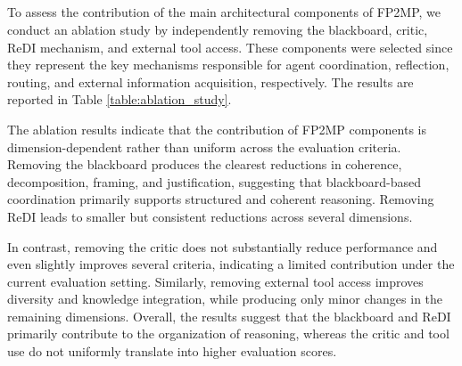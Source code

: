 \subsection{}

To assess the contribution of the main architectural components of FP2MP, we conduct an ablation study by independently removing the blackboard, critic, ReDI mechanism, and external tool access.
These components were selected since they represent the key mechanisms responsible for agent coordination, reflection, routing, and external information acquisition, respectively. The results are reported in Table \ref{table:ablation_study}.

\begin{table}[h]
\centering
\small
{}
\caption{ of FP2MP components across all evaluation criteria (mean ± std over 60 problem instances).}
\label{table:ablation_study}
\end{table}

The ablation results indicate that the contribution of FP2MP components is dimension-dependent rather than uniform across the evaluation criteria.
Removing the blackboard produces the clearest reductions in coherence, decomposition, framing, and justification, suggesting that blackboard-based coordination primarily supports structured and coherent reasoning.
Removing ReDI leads to smaller but consistent reductions across several dimensions.

In contrast, removing the critic does not substantially reduce performance and even slightly improves several criteria, indicating a limited contribution under the current evaluation setting.
Similarly, removing external tool access improves diversity and knowledge integration, while producing only minor changes in the remaining dimensions.
Overall, the results suggest that the blackboard and ReDI primarily contribute to the organization of reasoning, whereas the critic and tool use do not uniformly translate into higher evaluation scores.